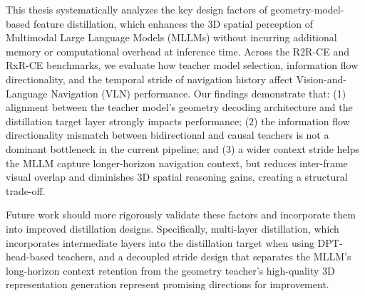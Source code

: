 This thesis systematically analyzes the key design factors of geometry-model-based feature distillation, which enhances the 3D spatial perception of Multimodal Large Language Models (MLLMs) without incurring additional memory or computational overhead at inference time. Across the R2R-CE and RxR-CE benchmarks, we evaluate how teacher model selection, information flow directionality, and the temporal stride of navigation history affect Vision-and-Language Navigation (VLN) performance. Our findings demonstrate that: (1) alignment between the teacher model's geometry decoding architecture and the distillation target layer strongly impacts performance; (2) the information flow directionality mismatch between bidirectional and causal teachers is not a dominant bottleneck in the current pipeline; and (3) a wider context stride helps the MLLM capture longer-horizon navigation context, but reduces inter-frame visual overlap and diminishes 3D spatial reasoning gains, creating a structural trade-off.

Future work should more rigorously validate these factors and incorporate them into improved distillation designs. Specifically, multi-layer distillation, which incorporates intermediate layers into the distillation target when using DPT-head-based teachers, and a decoupled stride design that separates the MLLM's long-horizon context retention from the geometry teacher's high-quality 3D representation generation represent promising directions for improvement.
